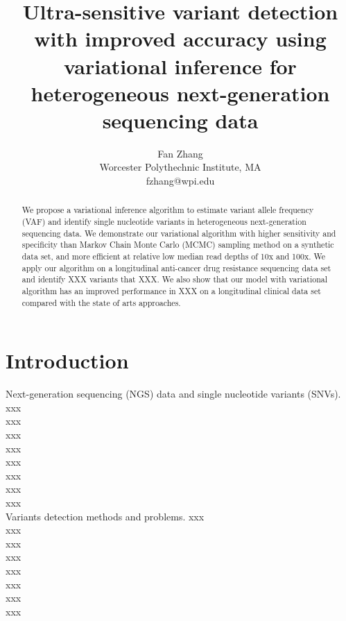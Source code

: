 \documentclass{article}
\title{Ultra-sensitive variant detection with improved accuracy using variational inference for heterogeneous next-generation sequencing data}
\author{Fan Zhang \\
Worcester Polythechnic Institute, MA  \\
fzhang@wpi.edu}
\begin{document}
\maketitle

\begin{abstract}
We propose a variational inference algorithm to estimate variant allele frequency (VAF) and identify single nucleotide variants in heterogeneous next-generation sequencing data.
We demonstrate our variational algorithm with higher sensitivity and specificity than Markov Chain Monte Carlo (MCMC) sampling method on a synthetic data set,
and more efficient at relative low median read depths of 10x and 100x.
We apply our algorithm on a longitudinal anti-cancer drug resistance sequencing data set and identify XXX variants that XXX.
We also show that our model with variational algorithm has an improved performance in XXX on a longitudinal clinical data set compared with the state of arts approaches.
\end{abstract}

\section{Introduction}
Next-generation sequencing (NGS) data and single nucleotide variants (SNVs).
xxx\\
xxx\\
xxx\\
xxx\\
xxx\\
xxx\\
xxx\\
xxx\\

Variants detection methods and problems.
xxx\\
xxx\\
xxx\\
xxx\\
xxx\\
xxx\\
xxx\\
xxx\\
\end{document}
